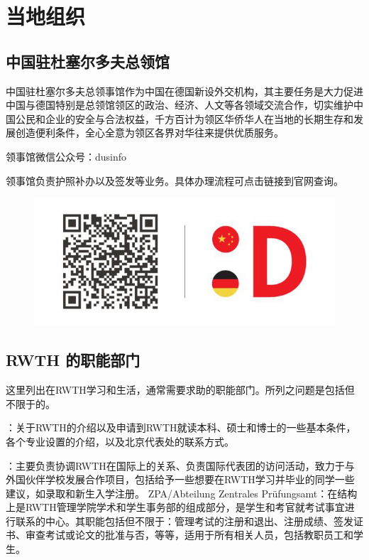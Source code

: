 
\chapter{当地组织}

\section{中国驻杜塞尔多夫总领馆}

中国驻杜塞尔多夫总领事馆作为中国在德国新设外交机构，其主要任务是大力促进中国与德国特别是总领馆领区的政治、经济、人文等各领域交流合作，切实维护中国公民和企业的安全与合法权益，千方百计为领区华侨华人在当地的长期生存和发展创造便利条件，全心全意为领区各界对华往来提供优质服务。

领事馆微信公众号：dusinfo

领事馆负责护照补办以及签发等业务。具体办理流程可点击链接到官网查询。

\begin{figure}[h]
\centering
\includegraphics[width=.5\textwidth]{Aachen及周边/Düsseldorf.png}
\end{figure}

\section{RWTH 的职能部门}

这里列出在RWTH学习和生活，通常需要求助的职能部门。所列之问题是包括但不限于的。

\href{https://www9.rwth-aachen.de/go/id/xga/}{}：关于RWTH的介绍以及申请到RWTH就读本科、硕士和博士的一些基本条件，各个专业设置的介绍，以及北京代表处的联系方式。

\href{https://www.rwth-aachen.de/go/id/pvd/lidx/1}{}：主要负责协调RWTH在国际上的关系、负责国际代表团的访问活动，致力于与外国伙伴学校发展合作项目，包括给予一些想要在RWTH学习并毕业的同学一些建议，如录取和新生入学注册。
ZPA/Abteilung Zentrales Prüfungsamt：在结构上是RWTH管理学院学术和学生事务部的组成部分，是学生和考官就考试事宜进行联系的中心。其职能包括但不限于：管理考试的注册和退出、注册成绩、签发证书、审查考试或论文的批准与否，等等，适用于所有相关人员，包括教职员工和学生。

